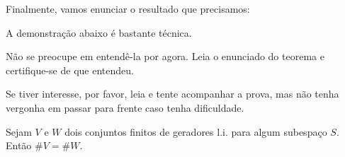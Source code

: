 Finalmente, vamos enunciar o resultado que precisamos:

\begin{tcolorbox}[breakable,colback=red!5!white,colframe=red!80!white,title=\normalsize {\sc AVISO!},coltitle=black]
	A demonstração abaixo é bastante técnica.
	
	Não se preocupe em entendê-la por agora. Leia o enunciado do teorema e certifique-se de que entendeu.
	
	Se tiver interesse, por favor, leia e tente acompanhar a prova, mas não tenha vergonha em passar para frente caso tenha dificuldade.
\end{tcolorbox}
\begin{theorem}\label{thm:gen li mesmo tamanho}
	Sejam $V$ e $W$ dois conjuntos finitos de geradores l.i. para algum subespaço $S$. Então $\#V=\#W$.
\end{theorem}
